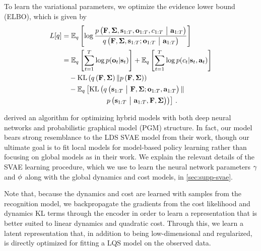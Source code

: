 To learn the variational parameters, we optimize the evidence lower bound (ELBO), which is given by
\begin{align*}
    L[q] &=\mathbb{E}_q\left[\log\frac{p\left(\mathbf{F},\bm{\Sigma},\mathbf{s}_{1:T},\mathbf{o}_{1:T},c_{1:T}~\big|~\mathbf{a}_{1:T}\right)}{q\left(\mathbf{F},\bm{\Sigma},\mathbf{s}_{1:T};\mathbf{o}_{1:T}~\big|~\mathbf{a}_{1:T}\right)}\right]\\
    &=\mathbb{E}_q\left[\sum_{t=1}^{T}\log{p}(\mathbf{o}_t|\mathbf{s}_t)\right]+\mathbb{E}_q\left[\sum_{t=1}^{T}\log{p}(c_t|\mathbf{s}_t,\mathbf{a}_t)\right]\\
    &\hspace{1em}-\mathrm{KL}\left(q\left(\mathbf{F},\bm{\Sigma}\right)\|p\left(\mathbf{F},\bm{\Sigma}\right)\right)\\
    &\hspace{1em}-\mathbb{E}_q\left[\mathrm{KL}\left(q\left(\mathbf{s}_{1:T}~\big|~\mathbf{F},\bm{\Sigma};\mathbf{o}_{1:T},\mathbf{a}_{1:T}\right)\|\right.\right.\\
    &\hspace{6em}\left.\left.p\left(\mathbf{s}_{1:T}~\big|~\mathbf{a}_{1:T},\mathbf{F},\bm{\Sigma}\right)\right)\right]\,.
\end{align*}

\citet{Johnson2016} derived an algorithm for optimizing hybrid models with both deep neural networks and probabilistic graphical model (PGM) structure. In fact, our model bears strong resemblance to the LDS SVAE model from their work, though our ultimate goal is to fit local models for model-based policy learning rather than focusing on global models as in their work. We explain the relevant details of the SVAE learning procedure, which we use to learn the neural network parameters $\gamma$ and $\phi$ along with the global dynamics and cost models, in \autoref{sec:supp-svae}.

Note that, because the dynamics and cost are learned with samples from the recognition model, we backpropagate the gradients from the cost likelihood and dynamics KL terms through the encoder in order to learn a representation that is better suited to linear dynamics and quadratic cost. Through this, we learn a latent representation that, in addition to being low-dimensional and regularized, is directly optimized for fitting a LQS model on the observed data.

